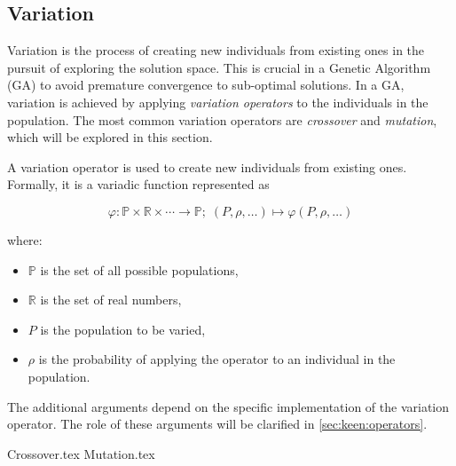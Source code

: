 \subsection{Variation}
\label{sec:genetic_algorithms:variation}
  Variation is the process of creating new individuals from existing ones in the pursuit of 
  exploring the solution space.
  This is crucial in a Genetic Algorithm (GA) to avoid premature convergence to sub-optimal
  solutions.
  In a GA, variation is achieved by applying \emph{variation operators} to the individuals in the 
  population.
  The most common variation operators are \emph{crossover} and \emph{mutation}, which will be 
  explored in this section.

  \begin{definition}
    \label{def:variation_operator}
    A variation operator is used to create new individuals from existing ones.
    Formally, it is a variadic function represented as 
    
    \[
      \varphi : \mathbb{P} \times \mathbb{R} \times \cdots \to \mathbb{P};\; 
      (P, \rho, \dots) \mapsto \varphi(P, \rho, \dots)
    \]
    
    where:

    \begin{itemize}
      \item \(\mathbb{P}\) is the set of all possible populations,
      \item \(\mathbb{R}\) is the set of real numbers,
      \item \(P\) is the population to be varied,
      \item \(\rho\) is the probability of applying the operator to an individual in the population.
    \end{itemize}

    The additional arguments depend on the specific implementation of the variation operator.
    The role of these arguments will be clarified in \vref{sec:keen:operators}.
  \end{definition}

  {Crossover.tex}
  {Mutation.tex}
